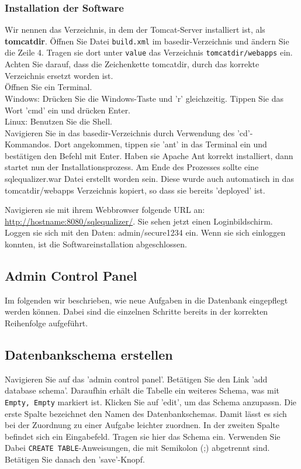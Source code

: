 \documentclass[12pt]{scrreprt}
\theoremstyle{remark}
\begin{document}
\subsubsection{Installation der Software}

Wir nennen das Verzeichnis, in dem der Tomcat-Server installiert ist, als \textbf{tomcatdir}.
Öffnen Sie Datei \verb|build.xml| im basedir-Verzeichnis und ändern Sie die Zeile 4. Tragen sie dort unter \verb|value| das Verzeichnis \verb|tomcatdir/webapps| ein. Achten Sie darauf, dass die Zeichenkette tomcatdir, durch das korrekte Verzeichnis ersetzt worden ist.\\

Öffnen Sie ein Terminal.\\
Windows: Drücken Sie die Windows-Taste und 'r' gleichzeitig. Tippen Sie das Wort 'cmd' ein und drücken Enter.\\
Linux: Benutzen Sie die Shell.\\

Navigieren Sie in das basedir-Verzeichnis durch Verwendung des 'cd'-Kommandos. Dort angekommen, tippen sie 'ant' in das Terminal ein und bestätigen den Befehl mit Enter. Haben sie Apache Ant korrekt installiert, dann startet nun der Installationsprozess. Am Ende des Prozesses sollte eine sqlequalizer.war Datei erstellt worden sein. Diese wurde auch automatisch in das tomcatdir/webapps Verzeichnis kopiert, so dass sie bereits 'deployed' ist. 

Navigieren sie mit ihrem Webbrowser folgende URL an: \url{http://hostname:8080/sqlequalizer/}. Sie sehen jetzt einen Loginbildschirm. Loggen sie sich mit den Daten: admin/secure1234 ein. Wenn sie sich einloggen konnten, ist die Softwareinstallation abgeschlossen.

\subsection{Admin Control Panel}

Im folgenden wir beschrieben, wie neue Aufgaben in die Datenbank eingepflegt werden können. Dabei sind die einzelnen Schritte bereits in der korrekten Reihenfolge aufgeführt.

\subsection{Datenbankschema erstellen}

Navigieren Sie auf das 'admin control panel'. Betätigen Sie den Link 'add database schema'. Daraufhin erhält die Tabelle ein weiteres Schema, was mit \verb|Empty, Empty| markiert ist. Klicken Sie auf 'edit', um das Schema anzupassn. Die erste Spalte bezeichnet den Namen des Datenbankschemas. Damit lässt es sich bei der Zuordnung zu einer Aufgabe leichter zuordnen. In der zweiten Spalte befindet sich ein Eingabefeld. Tragen sie hier das Schema ein. Verwenden Sie Dabei \verb|CREATE TABLE|-Anweisungen, die mit Semikolon (;) abgetrennt sind. Betätigen Sie danach den 'save'-Knopf.
\end{document}
